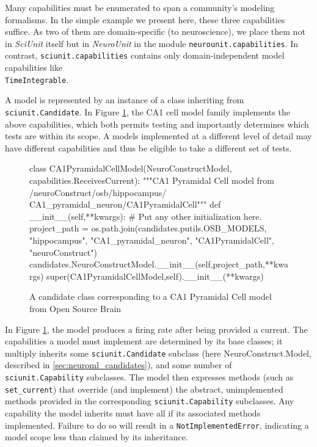 \documentclass[11pt,letterpaper]{article}
\begin{document}
Many capabilities must be enumerated to span a community's modeling formalisms. In the simple example we present here, these three capabilities suffice.  As two of them are domain-specific (to neuroscience), we place them not in \textit{SciUnit} itself but in \textit{NeuroUnit} in the module \verb|neurounit.capabilities|.  In contrast, \verb|sciunit.capabilities| contains only domain-independent model capabilities like\\ \verb|TimeIntegrable|.

A model is represented by an instance of a class inheriting from \verb|sciunit.Candidate|.  In Figure \ref{fig:ca1_model}, the CA1 cell model family implements the above capabilities, which both permits testing and importantly determines which tests are within its scope.  A models implemented at a different level of detail may have different capabilities and thus be eligible to take a different set of tests.  

\begin{figure}
\caption{A candidate class corresponding to a CA1 Pyramidal Cell model from Open Source Brain}
\label{fig:ca1_model}
\begin{python}
class CA1PyramidalCellModel(NeuroConstructModel,
				            capabilities.ReceivesCurrent):
	"""CA1 Pyramidal Cell model from /neuroConstruct/osb/hippocampus/
	CA1_pyramidal_neuron/CA1PyramidalCell"""
	def __init__(self,**kwargs):
		# Put any other initialization here.
		project_path = os.path.join(candidates.putils.OSB_MODELS,
									"hippocampus",
									"CA1_pyramidal_neuron",
									"CA1PyramidalCell",
									"neuroConstruct")
		candidates.NeuroConstructModel.__init__(self,project_path,**kwargs)
		super(CA1PyramidalCellModel,self).__init__(**kwargs)
\end{python}
\vspace{-18px}
\end{figure}

In Figure \ref{fig:ca1_model}, the model produces a firing rate after being provided a current.  The capabilities a model must implement are determined by its base classes; it multiply inherits some \verb|sciunit.Candidate| subclass (here NeuroConstruct.Model, described in \ref{sec:neuroml_candidates}), and some number of \verb|sciunit.Capability| subclasses.  The model then expresses methods (such as \verb|set_current|) that override (and implement) the abstract, unimplemented methods provided in the corresponding \verb|sciunit.Capability| subclasses.  Any capability the model inherits must have all if its associated methods implemented.  Failure to do so will result in a \verb|NotImplementedError|, indicating a model scope less than claimed by its inheritance.  
\end{document}
